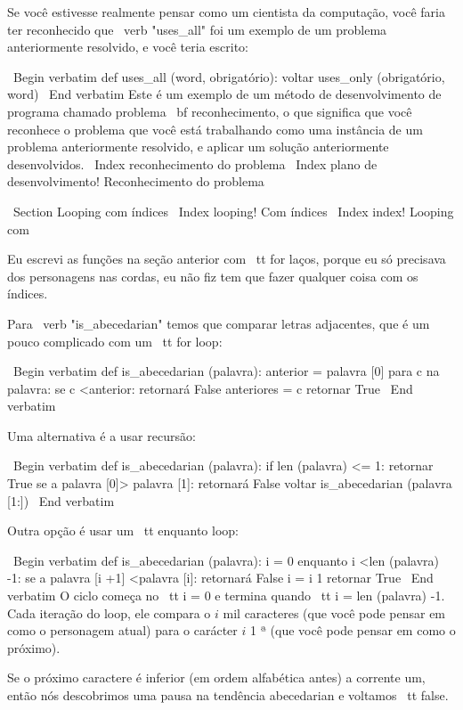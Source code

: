 \documentclass[10pt]{book}
\begin{document}
{{{{{{Se você estivesse realmente pensar como um cientista da computação, você faria
ter reconhecido que \ verb "uses_all" foi um exemplo de um
problema anteriormente resolvido, e você teria escrito:

\ Begin {verbatim}
def uses_all (word, obrigatório):
    voltar uses_only (obrigatório, word)
\ End {verbatim}
%
Este é um exemplo de um método de desenvolvimento de programa chamado problema {\ bf
reconhecimento}, o que significa que você reconhece o problema que você está
trabalhando como uma instância de um problema anteriormente resolvido, e aplicar um
solução anteriormente desenvolvidos.
\ Index {reconhecimento do problema}
\ Index {plano de desenvolvimento! Reconhecimento do problema}


\ Section {Looping com índices}
\ Index {looping! Com índices}
\ Index {index! Looping com}

Eu escrevi as funções na seção anterior com {\ tt for}
laços, porque eu só precisava dos personagens nas cordas, eu não fiz
tem que fazer qualquer coisa com os índices.

Para \ verb "is_abecedarian" temos que comparar letras adjacentes,
que é um pouco complicado com um {\ tt for} loop:

\ Begin {verbatim}
def is_abecedarian (palavra):
    anterior = palavra [0]
    para c na palavra:
        se c <anterior:
            retornará False
        anteriores = c
    retornar True
\ End {verbatim}


Uma alternativa é a
usar recursão:

\ Begin {verbatim}
def is_abecedarian (palavra):
    if len (palavra) <= 1:
        retornar True
    se a palavra [0]> palavra [1]:
        retornará False
    voltar is_abecedarian (palavra [1:])
\ End {verbatim}

Outra opção é usar um {\ tt enquanto} loop:

\ Begin {verbatim}
def is_abecedarian (palavra):
    i = 0
    enquanto i <len (palavra) -1:
        se a palavra [i +1] <palavra [i]:
            retornará False
        i = i 1
    retornar True
\ End {verbatim}
%
O ciclo começa no {\ tt i = 0} e termina quando {\ tt i = len (palavra) -1}. Cada
iteração do loop, ele compara o $ i $ mil caracteres (que você pode
pensar em como o personagem atual) para o carácter $ i $ 1 ª (que você
pode pensar em como o próximo).

Se o próximo caractere é inferior (em ordem alfabética antes) a corrente
um, então nós descobrimos uma pausa na tendência abecedarian e
voltamos {\ tt false}.

}}}}}}
\end{document}
